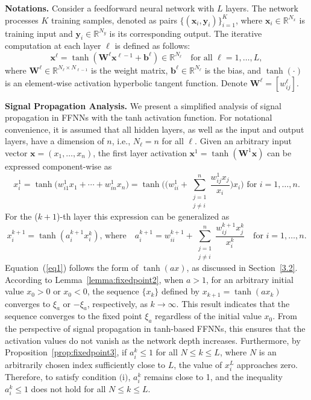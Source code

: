 \documentclass{article} \usepackage{iclr2025_conference,times}
\begin{document}
\textbf{Notations.} Consider a feedforward neural network with $L$ layers. 
The network processes $K$ training samples, denoted as pairs $\{(\bm{x}_i, \bm{y}_i)\}_{i=1}^K$, where $\bm{x}_i\in\mathbb{R}^{N_x}$ is training input and $\bm{y}_i\in\mathbb{R}^{N_y}$ is its corresponding output. The iterative computation at each layer $\ell$ is defined as follows:
$$
\bm{x}^\ell =\tanh(\mathbf{W}^{\ell}\bm{x}^{{\ell}-1}+\mathbf{b}^{\ell}) \in \mathbb{R}^{N_{\ell}} \quad \text{for all } \ell=1,\ldots,L,
$$
where $\mathbf{W}^{\ell} \in \mathbb{R}^{N_{\ell}\times N_{\ell-1}}$ is the weight matrix, $\mathbf{b}^{\ell} \in \mathbb{R}^{N_{\ell}}$ is the bias, and $\tanh(\cdot)$ is an element-wise activation hyperbolic tangent function. Denote $\mathbf{W}^{\ell}=[w_{ij}^{\ell}]$.

\textbf{Signal Propagation Analysis.} We present a simplified analysis of signal propagation in FFNNs with the tanh activation function. 
For notational convenience, it is assumed that all hidden layers, as well as the input and output layers, have a dimension of $n$, i.e., $N_{\ell}=n$ for all $\ell$. Given an arbitrary input vector $\bm{x} = (x_1, \ldots, x_n)$,  the first layer activation $\bm{x}^1 = \tanh(\mathbf{W}^1 \bm{x})$ can be expressed component-wise as
\[
x^1_i = \tanh\big(w^1_{i1} x_1 + \cdots + w^1_{in} x_n \big) = \tanh\bigg(\Big( w^1_{ii} + \sum_{\substack{j=1 \\ j \neq i}}^n \frac{w^1_{ij} x_j}{x_i} \Big) x_i\bigg) \text{ for } i = 1, \dots, n.
\]
For the ($k+1$)-th layer this expression can be generalized as
\begin{equation}\label{eq1}
x_i^{k+1} = \tanh\left( a_i^{k+1} x_i^{k} \right), \,
\text{where}\quad a_i^{k+1} = w^{k+1}_{ii} + \sum_{\substack{j=1 \\ j \neq i}}^n \frac{w^{k+1}_{ij} x_j^{k}}{x_i^{k}} \quad \text{for } i = 1, \ldots, n.
\end{equation}
Equation~(\ref{eq1}) follows the form of $\tanh(ax)$, as discussed in Section~\ref{3.2}.
According to Lemma~\ref{lemma:fixedpoint2}, when $a > 1$, for an arbitrary initial value $x_0>0$ or $x_0 <0$, the sequence $\{x_k\}$ defined by $x_{k+1} = \tanh(a x_k)$ converges to $\xi_a$ or $-\xi_a$, respectively, as $k \to \infty$. This result indicates that the sequence converges to the fixed point $\xi_a$ regardless of the initial value $x_0$. From the perspective of signal propagation in tanh-based FFNNs, this ensures that the activation values do not vanish as the network depth increases. 
Furthermore, by Proposition~\ref{prop:fixedpoint3}, if \( a^k_i \leq 1 \) for all \( N \leq k \leq L \), where \( N \) is an arbitrarily chosen index sufficiently close to \( L \), the value of \( x_i^L \) approaches zero. Therefore, to satisfy condition $($i$)$, \( a_i^k \) remains close to 1, and the inequality \( a_i^k \leq 1 \) does not hold for all \( N \leq k \leq L \).
\end{document}
